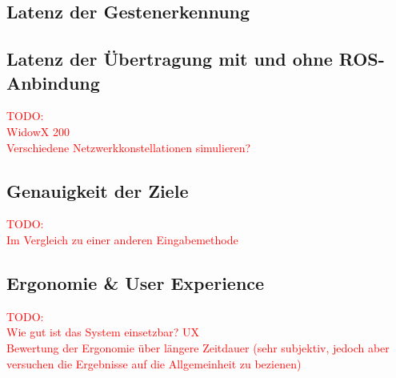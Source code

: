 \subsection{Latenz der Gestenerkennung}


\subsection{Latenz der Übertragung mit und ohne ROS-Anbindung}
\textcolor{red}{TODO:\\
WidowX 200\\
Verschiedene Netzwerkkonstellationen simulieren? %
}

\subsection{Genauigkeit der Ziele}
\textcolor{red}{TODO:\\
Im Vergleich zu einer anderen Eingabemethode
}


\subsection{Ergonomie \& User Experience}
\textcolor{red}{TODO:\\
Wie gut ist das System einsetzbar? UX\\
Bewertung der Ergonomie über längere Zeitdauer (sehr subjektiv, jedoch aber versuchen die Ergebnisse auf die Allgemeinheit zu bezienen)
}
